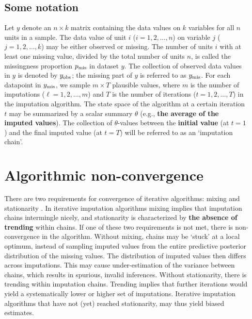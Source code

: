\documentclass[Royal,times,sageh]{sagej}
\begin{document}
\hypertarget{some-notation}{%
\subsection{Some notation}\label{some-notation}}

Let \(y\) denote an \(n \times k\) matrix containing the data values on \(k\) variables for all \(n\) units in a sample. The data value of unit \(i\) (\(i = 1, 2, \dots, n\)) on variable \(j\) (\(j = 1, 2, \dots, k\)) may be either observed or missing. The number of units \(i\) with at least one missing value, divided by the total number of units \(n\), is called the missingness proportion \(p_{\rm mis}\) in dataset \(y\). The collection of observed data values in \(y\) is denoted by \(y_{\rm obs}\); the missing part of \(y\) is referred to as \(y_{\rm mis}\). For each datapoint in \(y_{\rm mis}\), we sample \(m \times T\) plausible values, where \(m\) is the number of imputations (\(\ell = 1, 2, \dots, m\)) and \(T\) is the number of iterations (\(t = 1, 2, \dots, T\)) in the imputation algorithm. The state space of the algorithm at a certain iteration \(t\) may be summarized by a scalar summary \(\theta\) (e.g., \textbf{the average of the imputed values}). The collection of \(\theta\)-values between the \textbf{initial value} (at \(t=1\)) and the final imputed value (at \(t=T\)) will be referred to as an `imputation chain'.

\hypertarget{algorithmic-non-convergence}{%
\section{Algorithmic non-convergence}\label{algorithmic-non-convergence}}

There are two requirements for convergence of iterative algorithms: mixing and stationarity \citep{gelm13}. In iterative imputation algorithms mixing implies that imputation chains intermingle nicely, and stationarity is characterized by \textbf{the absence of trending} within chains. If one of these two requirements is not met, there is non-convergence in the algorithm. Without mixing, chains may be `stuck' at a local optimum, instead of sampling imputed values from the entire predictive posterior distribution of the missing values. The distribution of imputed values then differs across imputations. This may cause under-estimation of the variance between chains, which results in spurious, invalid inferences. Without stationarity, there is trending within imputation chains. Trending implies that further iterations would yield a systematically lower or higher set of imputations. Iterative imputation algorithms that have not (yet) reached stationarity, may thus yield biased estimates.
\end{document}
